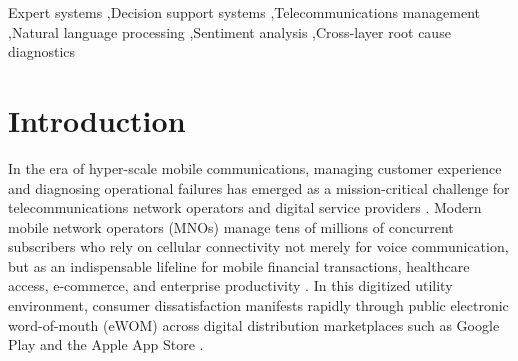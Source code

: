 \documentclass[review,12pt,authoryear]{elsarticle}
\begin{document}
\begin{frontmatter}
\begin{keyword}
Expert systems \sep Decision support systems \sep Telecommunications management \sep Natural language processing \sep Sentiment analysis \sep Cross-layer root cause diagnostics
\end{keyword}

\end{frontmatter}

\section{Introduction}
\label{sec:introduction}

In the era of hyper-scale mobile communications, managing customer experience and diagnosing operational failures has emerged as a mission-critical challenge for telecommunications network operators and digital service providers \citep{liao2005expert, sutherland2014role}. Modern mobile network operators (MNOs) manage tens of millions of concurrent subscribers who rely on cellular connectivity not merely for voice communication, but as an indispensable lifeline for mobile financial transactions, healthcare access, e-commerce, and enterprise productivity \citep{gsma2024mobile, itu2024measuring}. In this digitized utility environment, consumer dissatisfaction manifests rapidly through public electronic word-of-mouth (eWOM) across digital distribution marketplaces such as Google Play and the Apple App Store \citep{dellarocas2003digitization, hennig2004electronic}.
\end{document}

